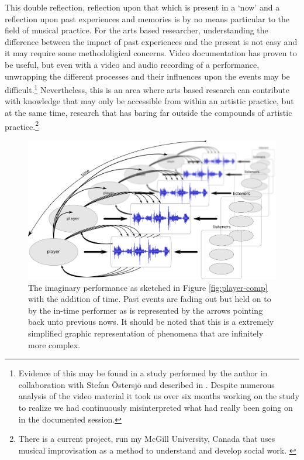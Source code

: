 This double reflection, reflection upon that which is present in a `now' and a reflection upon past experiences and memories is by no means particular to the field of musical practice. For the arts based researcher, understanding the difference between the impact of past experiences and the present is not easy and it may require some methodoligical concerns. Video documentation has proven to be useful, but even with a video and audio recording of a performance, unwrapping the different processes and their influences upon the events may be difficult.\footnote{Evidence of this may be found in a study performed by the author in collaboration with Stefan Östersjö and described in \cite{frisk-ost06,frisk-ost06-2}. Despite numerous analysis of the video material it took us over six months working on the study to realize we had continuously misinterpreted what had really been going on in the documented session.} Nevertheless, this is an area where arts based research can contribute with knowledge that may only be accessible from within an artistic practice, but at the same time, research that has baring far outside the compounds of artistic practice.\footnote{There is a current project, run my McGill University, Canada that uses musical improvisation as a method to understand and develop social work. \cite{lewis09}}

\begin{figure}[htb]
  \centering
  \includegraphics[width=\linewidth]{img/players-perspective}
  \caption{The imaginary performance as sketched in Figure \ref{fig:player-comp} with the addition of time. Past events are fading out but held on to by the in-time performer as is represented by the arrows pointing back unto previous nows. It should be noted that this is a extremely simplified graphic representation of phenomena that are infinitely more complex.}
  \label{fig:u}
\end{figure}


